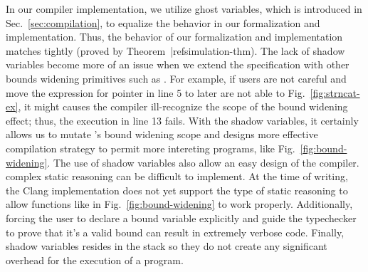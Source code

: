 In our compiler implementation, we utilize ghost variables, which is introduced in Sec.~\ref{sec:compilation}, to equalize the behavior in our formalization and implementation. Thus, the behavior of our formalization and implementation matches tightly (proved by Theorem~|ref{simulation-thm}).
The lack of shadow variables become more of an issue when we extend the
\checkedc specification with other bounds widening primitives such as . 
For example, if users are not careful and move the  expression for pointer  in line 5 to later  are not able to Fig.~\ref{fig:strncat-ex}, it might causes the compiler ill-recognize the scope of the  bound widening effect; thus, the execution in line 13 fails.
With the shadow variables, it certainly allows us to mutate 's bound widening scope and designs more effective compilation strategy to permit more intereting programs, like Fig.~\ref{fig:bound-widening}.
The use of shadow variables also allow an easy design of the compiler. 
complex static reasoning can be
difficult to implement. At the time of writing, the Clang \checkedc
implementation does not yet support the type of static reasoning to
allow functions like  in Fig.~\ref{fig:bound-widening} to work properly.
Additionally, forcing the
user to declare a bound variable explicitly and guide the typechecker
to prove that it's a valid bound can result in extremely verbose
code.
Finally, shadow variables resides in the stack so they do not create any significant overhead for the execution of a program. 




